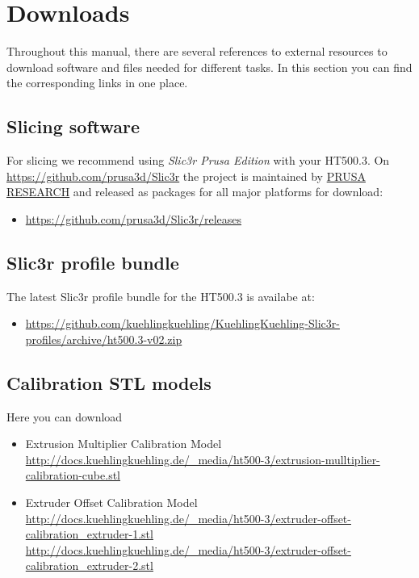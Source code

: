 \section{Downloads} \label{sec:downloads}

Throughout this manual, there are several references to external
resources to download software and files needed for different tasks. In this
section you can find the corresponding links in one place.

\subsection{Slicing software}

For slicing we recommend using \emph{Slic3r Prusa Edition} with your HT500.3. 
On \url{https://github.com/prusa3d/Slic3r} the project is maintained by
\href{http://prusa3d.com/}{PRUSA RESEARCH} and released as packages for 
all major platforms for download: 

\begin{itemize}
  \item \url{https://github.com/prusa3d/Slic3r/releases}
\end{itemize}


\subsection{Slic3r profile bundle}

The latest Slic3r profile bundle for the HT500.3 is availabe at:

\begin{itemize}
  \item \url{https://github.com/kuehlingkuehling/KuehlingKuehling-Slic3r-profiles/archive/ht500.3-v02.zip}
\end{itemize}  

\subsection{Calibration STL models}

Here you can download 

\begin{itemize}
  \item Extrusion Multiplier Calibration Model\\
        \url{http://docs.kuehlingkuehling.de/_media/ht500-3/extrusion-mulltiplier-calibration-cube.stl}
  \item Extruder Offset Calibration Model\\
        \url{http://docs.kuehlingkuehling.de/_media/ht500-3/extruder-offset-calibration_extruder-1.stl}\\
        \url{http://docs.kuehlingkuehling.de/_media/ht500-3/extruder-offset-calibration_extruder-2.stl}
\end{itemize}
